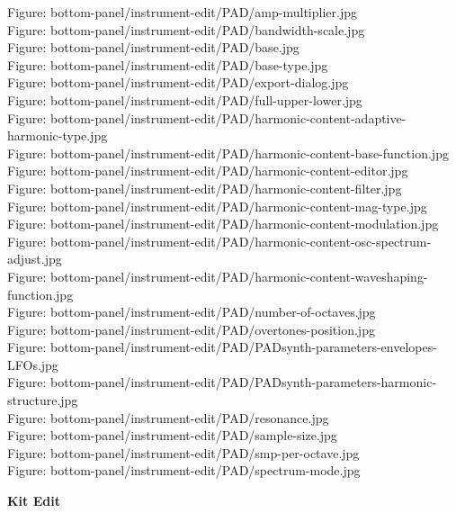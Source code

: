 \documentclass[
 11pt,
 twoside,
 a4paper,
 headinclude,
 footinclude,
 final                                 %
]{article}
\begin{document}
\begin{enumber}
\begin{enumber}
         Figure: bottom-panel/instrument-edit/PAD/amp-multiplier.jpg \\
         Figure: bottom-panel/instrument-edit/PAD/bandwidth-scale.jpg \\
         Figure: bottom-panel/instrument-edit/PAD/base.jpg \\
         Figure: bottom-panel/instrument-edit/PAD/base-type.jpg \\
         Figure: bottom-panel/instrument-edit/PAD/export-dialog.jpg \\
         Figure: bottom-panel/instrument-edit/PAD/full-upper-lower.jpg \\
         Figure: bottom-panel/instrument-edit/PAD/harmonic-content-adaptive-harmonic-type.jpg \\
         Figure: bottom-panel/instrument-edit/PAD/harmonic-content-base-function.jpg \\
         Figure: bottom-panel/instrument-edit/PAD/harmonic-content-editor.jpg \\
         Figure: bottom-panel/instrument-edit/PAD/harmonic-content-filter.jpg \\
         Figure: bottom-panel/instrument-edit/PAD/harmonic-content-mag-type.jpg \\
         Figure: bottom-panel/instrument-edit/PAD/harmonic-content-modulation.jpg \\
         Figure: bottom-panel/instrument-edit/PAD/harmonic-content-osc-spectrum-adjust.jpg \\
         Figure: bottom-panel/instrument-edit/PAD/harmonic-content-waveshaping-function.jpg \\
         Figure: bottom-panel/instrument-edit/PAD/number-of-octaves.jpg \\
         Figure: bottom-panel/instrument-edit/PAD/overtones-position.jpg \\
         Figure: bottom-panel/instrument-edit/PAD/PADsynth-parameters-envelopes-LFOs.jpg \\
         Figure: bottom-panel/instrument-edit/PAD/PADsynth-parameters-harmonic-structure.jpg \\
         Figure: bottom-panel/instrument-edit/PAD/resonance.jpg \\
         Figure: bottom-panel/instrument-edit/PAD/sample-size.jpg \\
         Figure: bottom-panel/instrument-edit/PAD/smp-per-octave.jpg \\
         Figure: bottom-panel/instrument-edit/PAD/spectrum-mode.jpg
      \item \textbf{Kit Edit} \\

\end{enumber}
\end{enumber}
\end{document}
